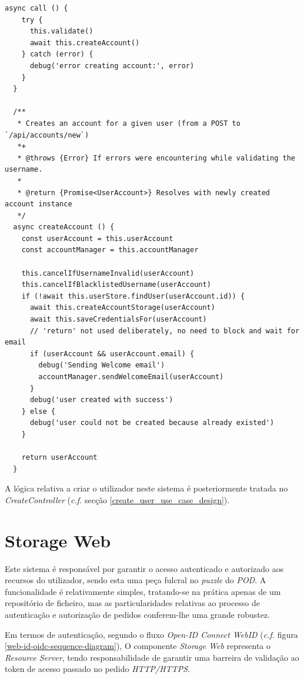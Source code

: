 \begin{lstlisting}[caption={código CreateAccountController}]
async call () {
    try {
      this.validate()
      await this.createAccount()
    } catch (error) {
      debug('error creating account:', error)
    }
  }

  /**
   * Creates an account for a given user (from a POST to `/api/accounts/new`)
   *+
   * @throws {Error} If errors were encountering while validating the username.
   *
   * @return {Promise<UserAccount>} Resolves with newly created account instance
   */
  async createAccount () {
    const userAccount = this.userAccount
    const accountManager = this.accountManager

    this.cancelIfUsernameInvalid(userAccount)
    this.cancelIfBlacklistedUsername(userAccount)
    if (!await this.userStore.findUser(userAccount.id)) {
      await this.createAccountStorage(userAccount)
      await this.saveCredentialsFor(userAccount)
      // 'return' not used deliberately, no need to block and wait for email
      if (userAccount && userAccount.email) {
        debug('Sending Welcome email')
        accountManager.sendWelcomeEmail(userAccount)
      }
      debug('user created with success')
    } else {
      debug('user could not be created because already existed')
    }

    return userAccount
  }

\end{lstlisting}

A lógica relativa a criar o utilizador neste sistema é posteriormente tratada no \emph{CreateController} (\emph{c.f.} secção \ref{create_user_use_case_design}).

\section{Storage Web}
Este sistema é responsável por garantir o acesso autenticado e autorizado aos recursos do utilizador, sendo esta uma peça fulcral no \emph{puzzle} do \emph{\acrshort{POD}}. A funcionalidade é relativamente simples, tratando-se na prática apenas de um repositório de ficheiro, mas as particularidades relativas ao processo de autenticação e autorização de pedidos conferem-lhe uma grande robustez.

Em termos de autenticação, segundo o fluxo \emph{Open-ID Connect WebID} (\emph{c.f.} figura \ref{web-id-oidc-sequence-diagram}), O componente \emph{Storage Web} representa o \emph{Resource Server}, tendo responsabilidade de garantir uma barreira de validação ao token de acesso passado no pedido \emph{HTTP/HTTPS}.

